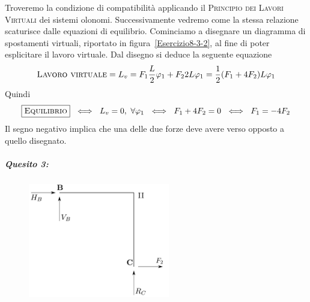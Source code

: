 Troveremo la condizione di compatibilità applicando il \textsc{Principio dei Lavori Virtuali} dei sistemi olonomi. Successivamente vedremo come la stessa relazione scaturisce dalle equazioni di equilibrio. Cominciamo a disegnare un diagramma di spostamenti virtuali, riportato in figura~\ref{Esercizio8-3-2}, al fine di poter esplicitare il lavoro virtuale. Dal disegno si deduce la seguente equazione 
\begin{equation*}
\textup{\textsc{Lavoro virtuale}} = L_{v} = F_{1}\frac{L}{2}\varphi_{1} + F_{2}2L\varphi_{1} = \frac{1}{2}(F_{1}+4F_{2})L\varphi_{1}
\end{equation*}
Quindi 
\begin{equation*}
\boxed{\textup{\textsc{Equilibrio}}} \,\,\iff\,\, L_v = 0, \,\,\forall\varphi_{1} \,\,\iff\,\, F_{1}+4F_{2}=0 \,\,\iff\,\, F_{1} = -4F_{2}
\end{equation*}
Il segno negativo implica che una delle due forze deve avere verso opposto a quello disegnato. 
\noindent \subparagraph{Quesito 3:}
\renewcommand{\thefigure}{8.3~-~3}
\begin{figure}[ht]
\centering
\includegraphics[width=0.55\textwidth]{Immagini/Parte_8/Esercizio8_3/Esercizio8_3_3.pdf}
\caption{}
\label{Esercizio8-3-3}
\end{figure}
